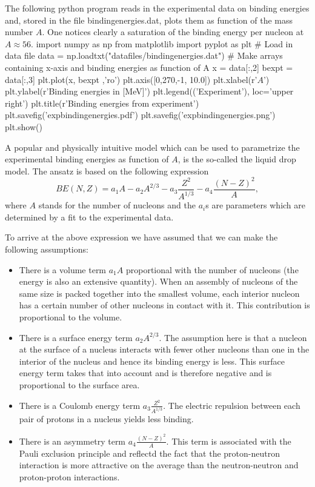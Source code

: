 \documentclass[%
twoside,                 %
final,                   %
10pt]{article}
\begin{document}
The following python program reads in the experimental data on binding energies and, stored in the file bindingenergies.dat,  plots them as function of the mass number $A$. One notices clearly a saturation of the binding energy per nucleon at $A\approx 56$.
\bpypro
import numpy as np
from  matplotlib import pyplot as plt
# Load in data file
data = np.loadtxt("datafiles/bindingenergies.dat")
# Make arrays containing x-axis and binding energies as function of A
x = data[:,2]
bexpt = data[:,3]
plt.plot(x, bexpt ,'ro')
plt.axis([0,270,-1, 10.0])
plt.xlabel(r'$A$')
plt.ylabel(r'Binding energies in [MeV]')
plt.legend(('Experiment'), loc='upper right')
plt.title(r'Binding energies from experiment')
plt.savefig('expbindingenergies.pdf')
plt.savefig('expbindingenergies.png')
plt.show()
\epypro

A popular and physically intuitive model which can be used to parametrize 
the experimental binding energies as function of $A$, is the so-called 
the liquid drop model. The ansatz is based on the following expression
\[ 
BE(N,Z) = a_1A-a_2A^{2/3}-a_3\frac{Z^2}{A^{1/3}}-a_4\frac{(N-Z)^2}{A},
\]
where $A$ stands for the number of nucleons and the $a_i$s are parameters which are determined by a fit 
to the experimental data.  

To arrive at the above expression we have assumed that we can make the following assumptions:

\begin{itemize}
 \item There is a volume term $a_1A$ proportional with the number of nucleons (the energy is also an extensive quantity). When an assembly of nucleons of the same size is packed together into the smallest volume, each interior nucleon has a certain number of other nucleons in contact with it. This contribution is proportional to the volume.

 \item There is a surface energy term $a_2A^{2/3}$. The assumption here is that a nucleon at the surface of a nucleus interacts with fewer other nucleons than one in the interior of the nucleus and hence its binding energy is less. This surface energy term takes that into account and is therefore negative and is proportional to the surface area.

 \item There is a Coulomb energy term $a_3\frac{Z^2}{A^{1/3}}$. The electric repulsion between each pair of protons in a nucleus yields less binding. 

 \item There is an asymmetry term $a_4\frac{(N-Z)^2}{A}$. This term is associated with the Pauli exclusion principle and reflectd the fact that the proton-neutron interaction is more attractive on the average than the neutron-neutron and proton-proton interactions.
\end{itemize}
\end{document}
